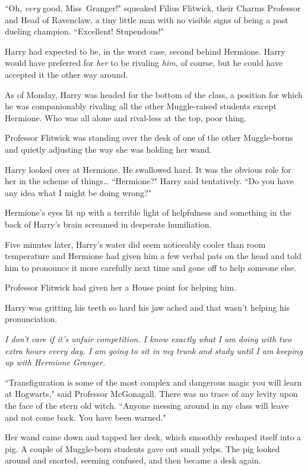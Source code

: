 ``Oh, \emph{very} good, Miss~Granger!" squeaked Filius Flitwick, their Charms Professor and Head of Ravenclaw, a tiny little man with no visible signs of being a past dueling champion. ``Excellent! Stupendous!"

Harry had expected to be, in the worst case, second behind Hermione. Harry would have preferred for \emph{her} to be rivaling \emph{him}, of course, but he could have accepted it the other way around.

As of Monday, Harry was headed for the bottom of the class, a position for which he was companionably rivaling all the other Muggle-raised students except Hermione. Who was all alone and rival-less at the top, poor thing.

Professor Flitwick was standing over the desk of one of the other Muggle-borns and quietly adjusting the way she was holding her wand.

Harry looked over at Hermione. He swallowed hard. It was the obvious role for her in the scheme of things{\ldots} ``Hermione?" Harry said tentatively. ``Do you have any idea what I might be doing wrong?"

Hermione's eyes lit up with a terrible light of helpfulness and something in the back of Harry's brain screamed in desperate humiliation.

Five minutes later, Harry's water did seem noticeably cooler than room temperature and Hermione had given him a few verbal pats on the head and told him to pronounce it more carefully next time and gone off to help someone else.

Professor Flitwick had given her a House point for helping him.

Harry was gritting his teeth so hard his jaw ached and that wasn't helping his pronunciation.

\emph{I don't care if it's unfair competition. I know exactly what I am doing with two extra hours every day. I am going to sit in my trunk and study until I am keeping up with Hermione Granger.}

\later

``Transfiguration is some of the most complex and dangerous magic you will learn at Hogwarts," said Professor McGonagall. There was no trace of any levity upon the face of the stern old witch. ``Anyone messing around in my class will leave and not come back. You have been warned."

Her wand came down and tapped her desk, which smoothly reshaped itself into a pig. A couple of Muggle-born students gave out small yelps. The pig looked around and snorted, seeming confused, and then became a desk again.

